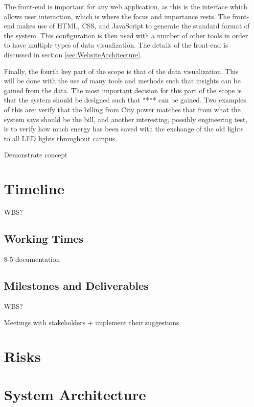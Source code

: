 \documentclass[12pt,onecolumn]{IEEEtran}
\begin{document}
The front-end is important for any web application, as this is the interface which allows user interaction, which is where the focus and importance rests. The front-end makes use of HTML, CSS, and JavaScript to generate the standard format of the system. This configuration is then used with a number of other tools in order to have multiple types of data visualization.
The details of the front-end is discussed in section \ref{sec:WebsiteArchitecture}.

Finally, the fourth key part of the scope is that of the data visualization. This will be done with the use of many tools and methods such that insights can be gained from the data. The most important decision for this part of the scope is that the system should be designed such that **** can be gained. Two examples of this are: verify that the billing from City power matches that from what the system says should be the bill, and another interesting, possibly engineering test, is to verify how much energy has been saved with the exchange of the old lights to all LED lights throughout campus. 


Demonstrate concept


\section{Timeline} \label{sec:Timeline}
WBS?

\subsection{Working Times} \label{sec:WorkingTimes}
8-5
documentation


\subsection{Milestones and Deliverables} \label{sec:MilestonesAndDeliverables}
WBS?

Meetings with stakeholders + implement their suggestions


\section{Risks} \label{sec:Risks}

\section{System Architecture} \label{sec:SystemArchitecture}
\end{document}
